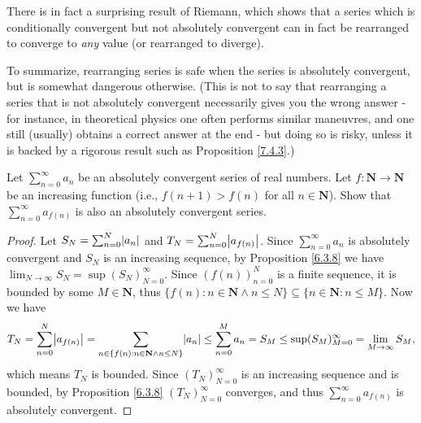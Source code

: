 \begin{note}
    There is in fact a surprising result of Riemann, which shows that a series which is conditionally convergent but not absolutely convergent can in fact be rearranged to converge to \emph{any} value
    (or rearranged to diverge).
\end{note}

\begin{note}
    To summarize, rearranging series is safe when the series is absolutely convergent, but is somewhat dangerous otherwise.
    (This is not to say that rearranging a series that is not absolutely convergent necessarily gives you the wrong answer
    - for instance, in theoretical physics one often performs similar maneuvres, and one still (usually) obtains a correct answer at the end
    - but doing so is risky, unless it is backed by a rigorous result such as Proposition \ref{7.4.3}.)
\end{note}

\exercisesection

\begin{exercise}\label{ex 7.4.1}
    Let \(\sum_{n = 0}^\infty a_n\) be an absolutely convergent series of real numbers.
    Let \(f : \mathbf{N} \to \mathbf{N}\) be an increasing function (i.e., \(f(n + 1) > f(n)\) for all \(n \in \mathbf{N}\)).
    Show that \(\sum_{n = 0}^\infty a_{f(n)}\) is also an absolutely convergent series.
\end{exercise}

\begin{proof}
    Let \(S_N = \sum_{n = 0}^N \abs*{a_n}\) and \(T_N = \sum_{n = 0}^N \abs*{a_{f(n)}}\).
    Since \(\sum_{n = 0}^\infty a_n\) is absolutely convergent and \(S_N\) is an increasing sequence, by Proposition \ref{6.3.8} we have \(\lim_{N \to \infty} S_N = \sup(S_N)_{N = 0}^\infty\).
    Since \((f(n))_{n = 0}^N\) is a finite sequence, it is bounded by some \(M \in \mathbf{N}\), thus \(\{f(n) : n \in \mathbf{N} \land n \leq N\} \subseteq \{n \in \mathbf{N} : n \leq M\}\).
    Now we have
    \[
        T_N = \sum_{n = 0}^N \abs*{a_{f(n)}} = \sum_{n \in \{f(n) : n \in \mathbf{N} \land n \leq N\}} \abs*{a_n} \leq \sum_{n = 0}^M a_n = S_M \leq \sup(S_M)_{M = 0}^\infty = \lim_{M \to \infty} S_M,
    \]
    which means \(T_N\) is bounded.
    Since \((T_N)_{N = 0}^\infty\) is an increasing sequence and is bounded, by Proposition \ref{6.3.8} \((T_N)_{N = 0}^\infty\) converges, and thus \(\sum_{n = 0}^\infty a_{f(n)}\) is absolutely convergent.
\end{proof}